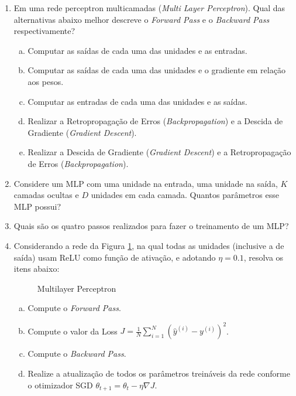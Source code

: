 \documentclass{dlproblemset}
\begin{document}
\begin{enumerate}[1)]
    \item Em uma rede perceptron multicamadas (\textit{Multi Layer Perceptron}). Qual das alternativas abaixo melhor descreve o \textit{Forward Pass} e o \textit{Backward Pass} respectivamente?
    \begin{enumerate}[(a)]
        \item Computar as saídas de cada uma das unidades e as entradas.
        \item Computar as saídas de cada uma das unidades e o gradiente em relação aos pesos.
        \item Computar as entradas de cada uma das unidades e as saídas.
        \item  Realizar a Retropropagação de Erros (\textit{Backpropagation}) e a Descida de Gradiente (\textit{Gradient Descent}).
        \item  Realizar a Descida de Gradiente (\textit{Gradient Descent}) e a Retropropagação de Erros (\textit{Backpropagation}).
    \end{enumerate}

    \item Considere um MLP com uma unidade na entrada, uma unidade na saída, $K$ camadas ocultas e $D$ unidades em cada camada. Quantos parâmetros esse MLP possui?

    \item Quais são os quatro passos realizados para fazer o treinamento de um MLP?

    \item Considerando a rede da Figura \ref{fig:mlp}, na qual todas as unidades (inclusive a de saída) usam ReLU como função de ativação, e adotando $\eta = 0.1$, resolva os itens abaixo:

    \begin{figure}[H]
        \centering
        \resizebox{0.68\linewidth}{!}{}
        \caption{Multilayer Perceptron}
        \label{fig:mlp}
    \end{figure}

    \begin{enumerate}[a)]
        \item Compute o \textit{Forward Pass}.
        \item Compute o valor da Loss $J=\frac{1}{N}\sum_{i=1}^{N}\left(\hat{y}^{(i)}-y^{(i)}\right)^2$.
        \item Compute o \textit{Backward Pass}.
        \item Realize a atualização de todos os parâmetros treináveis da rede conforme o otimizador SGD $\theta_{t+1}=\theta_t - \eta \nabla J$.
    \end{enumerate}


\end{enumerate}
\end{document}
